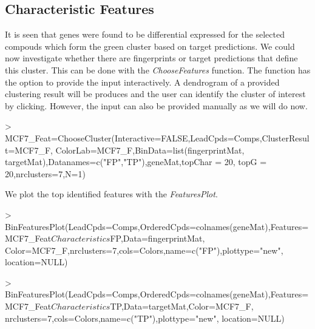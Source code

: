 \documentclass[a4paper]{article}
\begin{document}
\subsection{Characteristic Features}
It is seen that genes were found to be differential expressed for the selected
compouds which form the green cluster based on target predictions. We could now
investigate whether there are fingerprints or target predictions that define
this cluster. This can be done with the {\it ChooseFeatures} function. The
function has the option to provide the input interactively. A dendrogram of a
provided clustering result will be produces and the user can identify the
cluster of interest by clicking. However, the input can also be provided
manually as we will do now.
\begin{Schunk}
\begin{Sinput}
> MCF7_Feat=ChooseCluster(Interactive=FALSE,LeadCpds=Comps,ClusterResult=MCF7_F,
                         ColorLab=MCF7_F,BinData=list(fingerprintMat,
                         targetMat),Datanames=c("FP","TP"),geneMat,topChar = 20,
                         topG = 20,nrclusters=7,N=1)
\end{Sinput}
\end{Schunk}
\noindent We plot the top identified features with the {\it FeaturesPlot}.
\begin{Schunk}
\begin{Sinput}
> BinFeaturesPlot(LeadCpds=Comps,OrderedCpds=colnames(geneMat),Features=
                 MCF7_Feat$Characteristics$FP,Data=fingerprintMat,
                 Color=MCF7_F,nrclusters=7,cols=Colors,name=c("FP"),plottype="new",
                 location=NULL)
\end{Sinput}
\end{Schunk}
\begin{Schunk}
\begin{Sinput}
> BinFeaturesPlot(LeadCpds=Comps,OrderedCpds=colnames(geneMat),Features=
                 MCF7_Feat$Characteristics$TP,Data=targetMat,Color=MCF7_F,
                 nrclusters=7,cols=Colors,name=c("TP"),plottype="new",
                 location=NULL)
\end{Sinput}
\end{Schunk}
\end{document}
